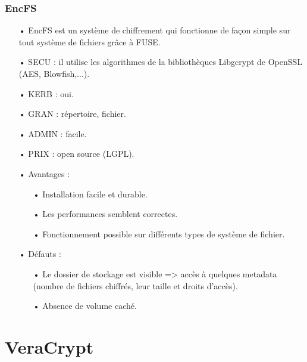 \documentclass[10pt,a4paper]{beamer}
\begin{document}
\begin{frame}
  \frametitle{EncFS}

\begin{itemize}
\item[•] EncFS est un système de chiffrement qui fonctionne de façon simple sur tout système de fichiers grâce à FUSE.
\item[•] SECU : il utilise les algorithmes de la bibliothèques Libgcrypt de OpenSSL (AES, Blowfish,...).
\item[•] KERB : oui.
\item[•] GRAN : répertoire, fichier.
\item[•] ADMIN : facile.
\item[•] PRIX : open source (LGPL).
\item[•] Avantages : 
\begin{itemize}
\item[•] Installation facile et durable.
\item[•] Les performances semblent correctes.
\item[•] Fonctionnement possible sur différents types de système de fichier.
\end{itemize}
\item[•] Défauts  : 
\begin{itemize}
\item[•] Le dossier de stockage est visible => accès à quelques metadata (nombre de fichiers chiffrés, leur taille et droits d'accès).
\item[•] Absence de volume caché.
\end{itemize}
\end{itemize}

\end{frame}

\section{VeraCrypt}
\end{document}
